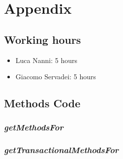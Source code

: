 \section{Appendix}
\subsection{Working hours}
\begin{itemize}
	\item Luca Nanni: 5 hours
	\item Giacomo Servadei: 5 hours
\end{itemize}
\subsection{Methods Code}
\subsubsection{\textit{getMethodsFor}}
\pagebreak
\subsubsection{\textit{getTransactionalMethodsFor}}
